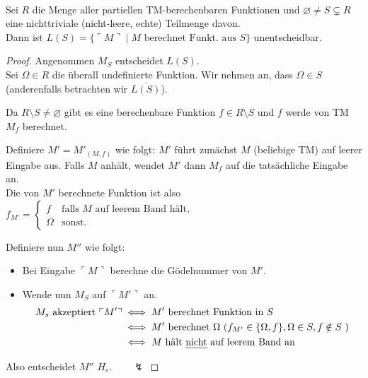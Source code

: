 \begin{Satz}\ \\
  Sei $R$ die Menge aller partiellen \ac{TM}-berechenbaren Funktionen und
  $\varnothing \neq S \subsetneq R$ eine nichttriviale (nicht-leere,
  echte) Teilmenge davon.\\
  Dann ist $L(S)=\{\ulcorner M \urcorner \mid M \text{ berechnet Funkt. aus
  }S\}$ unentscheidbar.
\end{Satz}
\begin{proof}
  Angenommen $M_S$ entscheidet $L(S)$.\\
  Sei $\Omega \in R$ die überall
  undefinierte Funktion. Wir nehmen an, dass $\Omega \in S$ (anderenfalls betrachten wir $\overline{L(S)}$).
  
  Da $R \setminus S \neq \varnothing$ gibt es eine berechenbare Funktion $ f \in R \setminus
  S$ und $f$ werde von \ac{TM} $M_f$ berechnet.
  
  Definiere $M'=M'_{(M, f)}$ wie folgt: $M'$ führt zunächst $M$ (beliebige \ac{TM}) auf leerer Eingabe aus. Falls $M$ anhält, wendet $M'$ dann $M_f$ auf die tatsächliche Eingabe an.\\
  Die von $M'$ berechnete Funktion ist also
  $f_{M'}=\begin{cases}
    f & \text{falls } M \text{ auf leerem Band hält,}\\
    \Omega & \text{sonst.}
  \end{cases}$
  
  Definiere nun $M''$ wie folgt:
  \begin{itemize}
  \item Bei Eingabe $\ulcorner M \urcorner$ berechne die Gödelnummer von $M'$.
  \item Wende nun $M_S$ auf $\ulcorner M' \urcorner$ an.
    \begin{align*}
      M_s\text{ akzeptiert }\ulcorner M' \urcorner
      &\iff M' \text{ berechnet Funktion in }S\\
      &\iff M' \text{ berechnet }\Omega \text{ ($f_{M'} \in \{\Omega, f\}, \Omega \in S, f \notin S$ )}\\
      &\iff M \text{ hält \emph{nicht} auf leerem Band an}
    \end{align*}
  \end{itemize}
  Also entscheidet $M''$ $H_\varepsilon$.$\qquad\lightning$
\end{proof}


